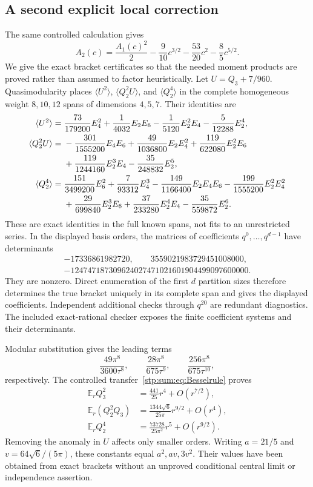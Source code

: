 \documentclass[11pt]{article}
\theoremstyle{remark}\newtheorem{remark}[theorem]{Remark}
\newcommand{\E}{\mathbb E}
\begin{document}
\subsection{A second explicit local correction}
\label{stp:sum:sub:A2}
The same controlled calculation gives
\begin{equation}\label{stp:sum:eq:A2}
 A_2(c)=\frac{A_1(c)^2}{2}-\frac9{10}c^{3/2}
                    -\frac{53}{20}c^2-\frac85c^{5/2}.
\end{equation}
We give the exact bracket certificates so that the needed moment products are proved rather than assumed to factor heuristically. Let $U=Q_3+7/960$. Quasimodularity places $\langle U^2\rangle$, $\langle Q_2^2U\rangle$, and $\langle Q_2^4\rangle$ in the complete homogeneous weight $8,10,12$ spans of dimensions $4,5,7$. Their identities are
\begin{align}
 \langle U^2\rangle={}&\frac{73}{179200}E_4^2+\frac1{4032}E_2E_6
 -\frac1{5120}E_2^2E_4-\frac5{12288}E_2^4,\label{stp:sum:eq:U2}\\
 \langle Q_2^2U\rangle={}&-\frac{301}{1555200}E_4E_6
 +\frac{49}{1036800}E_2E_4^2+\frac{119}{622080}E_2^2E_6\notag\\
 &+\frac{119}{1244160}E_2^3E_4-\frac{35}{248832}E_2^5,\label{stp:sum:eq:Q2U}\\
 \langle Q_2^4\rangle={}&\frac{151}{3499200}E_6^2+\frac7{93312}E_4^3
 -\frac{149}{1166400}E_2E_4E_6-\frac{199}{1555200}E_2^2E_4^2\notag\\
 &+\frac{29}{699840}E_2^3E_6+\frac{37}{233280}E_2^4E_4
 -\frac{35}{559872}E_2^6.\label{stp:sum:eq:Q24}
\end{align}
These are exact identities in the full known spans, not fits to an unrestricted series. In the displayed basis orders, the matrices of coefficients $q^0,\ldots,q^{d-1}$ have determinants
\begin{gather*}
 -17336861982720,\qquad 3559021983729451008000,\\
 -124747187309624027471021601904499097600000.
\end{gather*}
They are nonzero. Direct enumeration of the first $d$ partition sizes therefore determines the true bracket uniquely in its complete span and gives the displayed coefficients. Independent additional checks through $q^{20}$ are redundant diagnostics. The included exact-rational checker exposes the finite coefficient systems and their determinants.

Modular substitution gives the leading terms
\[
 \frac{49\pi^8}{3600\tau^8},\qquad
 \frac{28\pi^8}{675\tau^9},\qquad
 \frac{256\pi^8}{675\tau^{10}},
\]
respectively. The controlled transfer~\eqref{stp:sum:eq:Besselrule} proves
\begin{align*}
 \E_rQ_3^2&=\frac{441}{25}r^4+O(r^{7/2}),\\
 \E_r(Q_2^2Q_3)&=\frac{1344\sqrt6}{25\pi}r^{9/2}+O(r^4),\\
 \E_rQ_2^4&=\frac{73728}{25\pi^2}r^5+O(r^{9/2}).
\end{align*}
Removing the anomaly in $U$ affects only smaller orders. Writing $a=21/5$ and $v=64\sqrt6/(5\pi)$, these constants equal $a^2,av,3v^2$. Their values have been obtained from exact brackets without an unproved conditional central limit or independence assertion.
\end{document}
